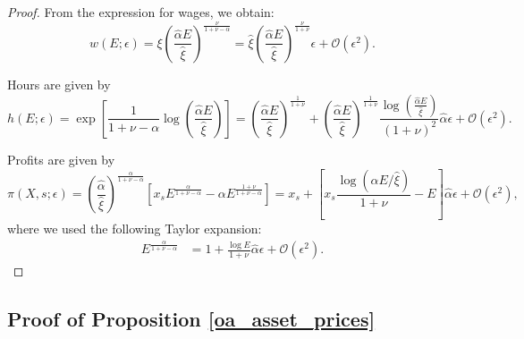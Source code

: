 \begin{proof}
From the expression for wages, we obtain:
\begin{equation}
    w(E; \epsilon) = \xi \left( \frac{\hat{\alpha} E}{\hat{\xi}} \right)^{\frac{\nu}{1+\nu -\alpha}} = \hat{\xi}\left( \frac{\hat{\alpha} E}{\hat{\xi}} \right)^{\frac{\nu}{1+\nu}} \epsilon + \mathcal{O}(\epsilon^2).
\end{equation}

Hours are given by
\begin{equation}
    h(E; \epsilon) = \exp \left[\frac{1}{1+\nu -\alpha} \log \left( \frac{\hat{\alpha} E}{\hat{\xi}} \right) \right] = \left( \frac{\hat{\alpha} E}{\hat{\xi}} \right)^{\frac{1}{1+\nu}} + \left( \frac{\hat{\alpha} E}{\hat{\xi}} \right)^{\frac{1}{1+\nu}} \frac{\log \left( \frac{\hat{\alpha} E}{\hat{\xi}} \right)}{(1+\nu)^2} \hat{\alpha}\epsilon + \mathcal{O}(\epsilon^2).
\end{equation}

Profits are given by 
\begin{equation}
    \pi(X,s;\epsilon) = \left( \frac{\hat{\alpha}}{\hat{\xi}} \right)^{\frac{\alpha}{1+\nu -\alpha}} \left[  x_s E^{\frac{\alpha}{1+\nu - \alpha}} - \alpha E^{\frac{1+\nu}{1+\nu - \alpha}}\right] = x_s +  \left[ x_s \frac{\log \left( \hat{\alpha} E/   \hat{\xi} \right)}{1+\nu} -E \right] \hat{\alpha} \epsilon + \mathcal{O}(\epsilon^2),
\end{equation}
where we used the following Taylor expansion:
\begin{align}
    E^{\frac{\alpha}{1+\nu - \alpha}} &= 1 + \frac{\log E}{1+\nu}  \hat{\alpha} \epsilon + \mathcal{O}(\epsilon^2).
\end{align}
\end{proof}

\subsection{Proof of Proposition \ref{oa_asset_prices}}\label{proof: oa_asset_prices}


